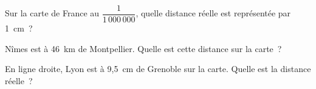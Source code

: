 \par Sur la carte de France au $\dfrac1{1\,000\,000}$, quelle distance réelle est représentée par 1~cm ?
\par Nîmes est à 46~km de Montpellier. Quelle est cette distance sur la carte ?
\par En ligne droite, Lyon est à 9,5~cm de Grenoble sur la carte. Quelle est la distance réelle ?